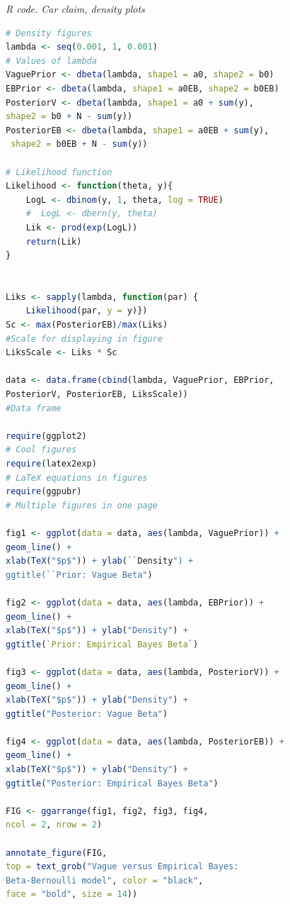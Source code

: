 \begin{enumerate}[leftmargin=*]
\begin{tcolorbox}[enhanced,width=4.67in,center upper,
	fontupper=\large\bfseries,drop shadow southwest,sharp corners]
	\textit{R code. Car claim, density plots}
\begin{VF}
\begin{lstlisting}[basicstyle=\scriptsize, language=R]
# Density figures
lambda <- seq(0.001, 1, 0.001) 
# Values of lambda
VaguePrior <- dbeta(lambda, shape1 = a0, shape2 = b0)
EBPrior <- dbeta(lambda, shape1 = a0EB, shape2 = b0EB)
PosteriorV <- dbeta(lambda, shape1 = a0 + sum(y), 
shape2 = b0 + N - sum(y))
PosteriorEB <- dbeta(lambda, shape1 = a0EB + sum(y),
 shape2 = b0EB + N - sum(y))

# Likelihood function
Likelihood <- function(theta, y){
	LogL <- dbinom(y, 1, theta, log = TRUE)
	#  LogL <- dbern(y, theta)
	Lik <- prod(exp(LogL))
	return(Lik)
}


Liks <- sapply(lambda, function(par) {
	Likelihood(par, y = y)})
Sc <- max(PosteriorEB)/max(Liks) 
#Scale for displaying in figure
LiksScale <- Liks * Sc

data <- data.frame(cbind(lambda, VaguePrior, EBPrior, 
PosteriorV, PosteriorEB, LiksScale)) 
#Data frame

require(ggplot2) 
# Cool figures
require(latex2exp) 
# LaTeX equations in figures
require(ggpubr) 
# Multiple figures in one page

fig1 <- ggplot(data = data, aes(lambda, VaguePrior)) + 
geom_line() +  
xlab(TeX("$p$")) + ylab(``Density") +
ggtitle(``Prior: Vague Beta") 

fig2 <- ggplot(data = data, aes(lambda, EBPrior)) + 
geom_line() +  
xlab(TeX("$p$")) + ylab("Density") +
ggtitle(`Prior: Empirical Bayes Beta`)

fig3 <- ggplot(data = data, aes(lambda, PosteriorV)) + 
geom_line() +  
xlab(TeX("$p$")) + ylab("Density") +
ggtitle("Posterior: Vague Beta")

fig4 <- ggplot(data = data, aes(lambda, PosteriorEB)) + 
geom_line() +  
xlab(TeX("$p$")) + ylab("Density") +
ggtitle("Posterior: Empirical Bayes Beta")

FIG <- ggarrange(fig1, fig2, fig3, fig4,
ncol = 2, nrow = 2)

annotate_figure(FIG,
top = text_grob("Vague versus Empirical Bayes: 
Beta-Bernoulli model", color = "black", 
face = "bold", size = 14))
			
\end{lstlisting}
\end{VF}
\end{tcolorbox}


\end{enumerate}
